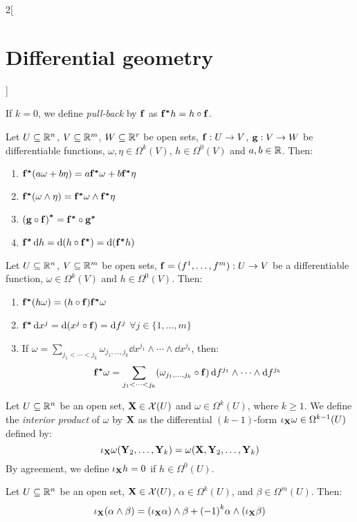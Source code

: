 \documentclass[../../../main_math.tex]{subfiles}
\begin{document}
\begin{multicols}{2}[\section{Differential geometry}]
\begin{definition}
    If $k=0$, we define \emph{pull-back} by $\boldsymbol{\mathrm{f}}$ as $\boldsymbol{\mathrm{f^*}}h=h\circ\boldsymbol{\mathrm{f}}$.
  \end{definition}
  \begin{proposition}
    Let $U\subseteq\mathbb{R}^n$, $V\subseteq\mathbb{R}^m$, $W\subseteq\mathbb{R}^r$ be open sets, $\boldsymbol{\mathrm{f}}:U\rightarrow V$, $\boldsymbol{\mathrm{g}}:V\rightarrow W$ be differentiable functions, $\omega,\eta\in\Omega^k(V)$, $h\in\Omega^0(V)$ and $a,b\in\mathbb{R}$. Then:
    \begin{enumerate}
      \item $\boldsymbol{\mathrm{f^*}}(a\omega+b\eta)=a\boldsymbol{\mathrm{f^*}}\omega+b\boldsymbol{\mathrm{f^*}}\eta$
      \item $\boldsymbol{\mathrm{f^*}}(\omega\wedge\eta)=\boldsymbol{\mathrm{f^*}}\omega\wedge \boldsymbol{\mathrm{f^*}}\eta$
      \item ${(\boldsymbol{\mathrm{g}}\circ \boldsymbol{\mathrm{f}})}^{\boldsymbol{\mathrm{*}}}=\boldsymbol{\mathrm{f^*}}\circ \boldsymbol{\mathrm{g^*}}$
      \item $\boldsymbol{\mathrm{f^*}}\dd{h}=\dd{(h\circ \boldsymbol{\mathrm{f^*}})}=\dd{(\boldsymbol{\mathrm{f^*}}h)}$
    \end{enumerate}
  \end{proposition}
  \begin{corollary}
    Let $U\subseteq\mathbb{R}^n$, $V\subseteq\mathbb{R}^m$ be open sets, $\boldsymbol{\mathrm{f}}=(f^1,\ldots,f^m):U\rightarrow V$ be a differentiable function, $\omega\in\Omega^k(V)$ and $h\in\Omega^0(V)$. Then:
    \begin{enumerate}
      \item $\boldsymbol{\mathrm{f^*}}(h\omega)=(h\circ \boldsymbol{\mathrm{f}})\boldsymbol{\mathrm{f^*}}\omega$
      \item $\boldsymbol{\mathrm{f^*}}\dd{x^j}=\dd{(x^j\circ \boldsymbol{\mathrm{f}})}=\dd{f^j}$ $\forall j\in\{1,\ldots,m\}$
      \item If $\omega=\sum_{j_1<\cdots<j_k}\omega_{j_1,\ldots,j_k}\dd{x^{j_1}}\wedge\cdots\wedge\dd{x^{j_k}}$, then: $$\boldsymbol{\mathrm{f^*}}\omega=\sum_{j_1<\cdots<j_k}(\omega_{j_1,\ldots,j_k}\circ \boldsymbol{\mathrm{f}})\dd{f^{j_1}}\wedge\cdots\wedge\dd{f^{j_k}}$$
    \end{enumerate}
  \end{corollary}
  \begin{definition}
    Let $U\subseteq\mathbb{R}^n$ be an open set, $\boldsymbol{\mathrm{X}}\in\mathcal{X}(U)$ and $\omega\in\Omega^k(U)$, where $k\geq 1$.
    We define the \emph{interior product} of $\omega$ by $\boldsymbol{\mathrm{X}}$ as the differential $(k-1)$-form $\iota_{\boldsymbol{\mathrm{X}}}\omega\in\Omega^{k-1}(U)$ defined by:
    $$\iota_{\boldsymbol{\mathrm{X}}}\omega(\boldsymbol{\mathrm{Y}}_2,\ldots,\boldsymbol{\mathrm{Y}}_k)=\omega(\boldsymbol{\mathrm{X}},\boldsymbol{\mathrm{Y}}_2,\ldots,\boldsymbol{\mathrm{Y}}_k)$$
    By agreement, we define $\iota_{\boldsymbol{\mathrm{X}}}h=0$ if $h\in\Omega^0(U)$.
  \end{definition}
  \begin{proposition}
    Let $U\subseteq\mathbb{R}^n$ be an open set, $\boldsymbol{\mathrm{X}}\in\mathcal{X}(U)$, $\alpha\in\Omega^k(U)$, and $\beta\in\Omega^m(U)$. Then: $$\iota_{\boldsymbol{\mathrm{X}}}(\alpha\wedge\beta)=(\iota_{\boldsymbol{\mathrm{X}}}\alpha)\wedge\beta+{(-1)}^k\alpha\wedge(\iota_{\boldsymbol{\mathrm{X}}}\beta)$$

\end{proposition}
\end{multicols}
\end{document}

